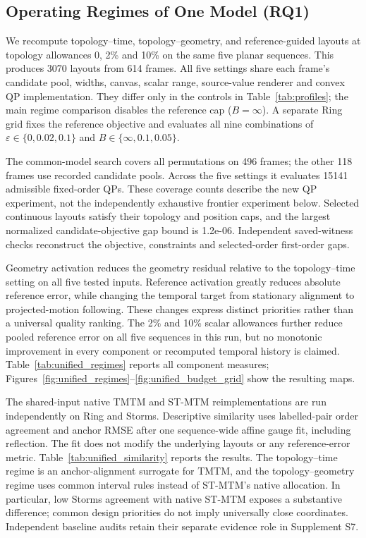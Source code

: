 \subsection{Operating Regimes of One Model (RQ1)}
We recompute topology--time, topology--geometry, and reference-guided layouts at topology allowances 0, 2\% and 10\% on the same five planar sequences. This produces 3070 layouts from 614 frames. All five settings share each frame's candidate pool, widths, canvas, scalar range, source-value renderer and convex QP implementation. They differ only in the controls in Table~\ref{tab:profiles}; the main regime comparison disables the reference cap ($B=\infty$). A separate Ring grid fixes the reference objective and evaluates all nine combinations of $\varepsilon\in\{0,0.02,0.1\}$ and $B\in\{\infty,0.1,0.05\}$.

The common-model search covers all permutations on 496 frames; the other 118 frames use recorded candidate pools. Across the five settings it evaluates 15141 admissible fixed-order QPs. These coverage counts describe the new QP experiment, not the independently exhaustive frontier experiment below. Selected continuous layouts satisfy their topology and position caps, and the largest normalized candidate-objective gap bound is 1.2e-06. Independent saved-witness checks reconstruct the objective, constraints and selected-order first-order gaps.

Geometry activation reduces the geometry residual relative to the topology--time setting on all five tested inputs. Reference activation greatly reduces absolute reference error, while changing the temporal target from stationary alignment to projected-motion following. These changes express distinct priorities rather than a universal quality ranking. The 2\% and 10\% scalar allowances further reduce pooled reference error on all five sequences in this run, but no monotonic improvement in every component or recomputed temporal history is claimed. Table~\ref{tab:unified_regimes} reports all component measures; Figures~\ref{fig:unified_regimes}--\ref{fig:unified_budget_grid} show the resulting maps.

The shared-input native TMTM and ST-MTM reimplementations are run independently on Ring and Storms. Descriptive similarity uses labelled-pair order agreement and anchor RMSE after one sequence-wide affine gauge fit, including reflection. The fit does not modify the underlying layouts or any reference-error metric. Table~\ref{tab:unified_similarity} reports the results. The topology--time regime is an anchor-alignment surrogate for TMTM, and the topology--geometry regime uses common interval rules instead of ST-MTM's native allocation. In particular, low Storms agreement with native ST-MTM exposes a substantive difference; common design priorities do not imply universally close coordinates. Independent baseline audits retain their separate evidence role in Supplement S7.

